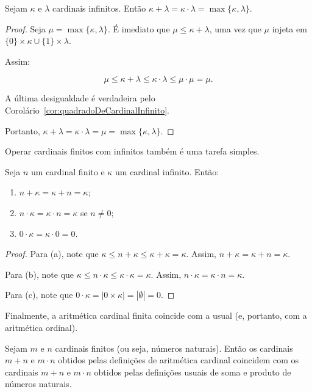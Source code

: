 \begin{theorem}
    Sejam $\kappa$ e $\lambda$ cardinais infinitos.
    Então $\kappa + \lambda = \kappa \cdot \lambda = \max\{\kappa, \lambda\}$.
\end{theorem}
\begin{proof}
    Seja $\mu=\max\{\kappa, \lambda\}$.
    É imediato que $\mu\leq \kappa + \lambda$, uma vez que $\mu$ injeta em $\{0\}\times \kappa \cup \{1\}\times \lambda$.

    Assim:

    \[
    \mu \leq \kappa + \lambda \leq \kappa \cdot \lambda \leq \mu \cdot \mu = \mu.
    \]

    A última desigualdade é verdadeira pelo Corolário~\ref{cor:quadradoDeCardinalInfinito}.

    Portanto, $\kappa + \lambda = \kappa \cdot \lambda = \mu=\max\{\kappa, \lambda\}$.
\end{proof}
Operar cardinais finitos com infinitos também é uma tarefa simples.
\begin{lemma}
    Seja $n$ um cardinal finito e $\kappa$ um cardinal infinito.
    Então:
    \begin{enumerate}[label=(\alph*)]
        \item $n+\kappa = \kappa + n = \kappa$;
        \item $n\cdot \kappa = \kappa \cdot n = \kappa$ se $n\neq 0$;
        \item $0\cdot \kappa = \kappa \cdot 0 = 0$.
    \end{enumerate}
\end{lemma}
\begin{proof}
    Para (a), note que $\kappa\leq n+\kappa\leq \kappa+\kappa = \kappa$.
    Assim, $n+\kappa = \kappa + n = \kappa$.

    Para (b), note que $\kappa\leq n\cdot \kappa\leq \kappa\cdot \kappa = \kappa$.
    Assim, $n\cdot \kappa = \kappa \cdot n = \kappa$.

    Para (c), note que $0\cdot \kappa =|0\times \kappa|=|\emptyset|=0$.
\end{proof}

Finalmente, a aritmética cardinal finita coincide com a usual (e, portanto, com a aritmética ordinal).

\begin{lemma}
    Sejam $m$ e $n$ cardinais finitos (ou seja, números naturais).
    Então os cardinais $m+n$ e $m\cdot n$ obtidos pelas definições de aritmética cardinal coincidem com os cardinais $m+n$ e $m\cdot n$ obtidos pelas definições usuais de soma e produto de números naturais.
\end{lemma}


